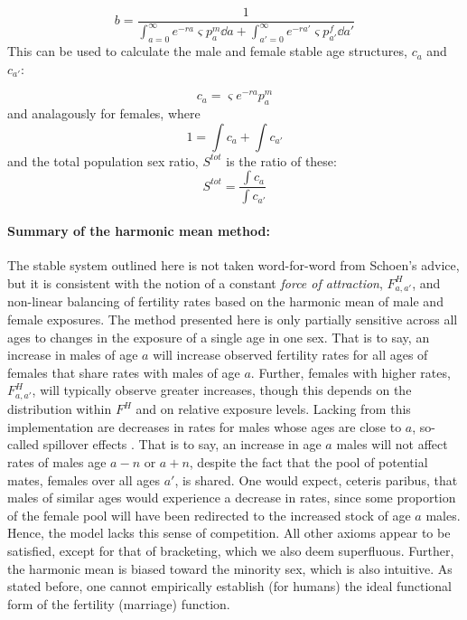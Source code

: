 \begin{equation}
b = \frac{1}{\int_{a = 0}^\infty e^{-ra} \varsigma p_a^m \dd a + \int_{a' =
0}^\infty e^{-ra'} \varsigma p_{a'}^f \dd a'}
\end{equation}
This can be used to calculate the male and female stable age structures, $c_a$
and $c_{a'}$:

\begin{equation}
c_a =  \varsigma  e^{-ra} p_a^m
\end{equation}
and analagously for females, where
\begin{equation}
1 = \int c_a + \int c_{a'}
\end{equation}
and the total population sex ratio, $S^{tot}$ is the ratio of these:
\begin{equation}
S^{tot} = \frac{\int c_a}{\int c_{a'}}
\end{equation}

\paragraph{Summary of the harmonic mean method: } The stable system outlined
here is not taken word-for-word from Schoen's advice, but it is consistent with the 
notion of a constant \textit{force of attraction},
$F_{a,a'}^H$, and non-linear balancing of fertility rates based on the harmonic
mean of male and female exposures. The method presented here is only partially
sensitive across all ages to changes in the exposure of a single age in one sex.
That is to say, an increase in males of age $a$ will increase observed fertility rates for all ages
of females that share rates with males of age $a$. Further, females with
higher rates, $F_{a,a'}^H$, will typically observe greater increases, though this
depends on the distribution within $F^H$ and on relative exposure levels.
Lacking from this implementation are decreases in rates for males whose ages are close
to $a$, so-called spillover effects \citep{choo2006estimating}. That is to say,
an increase in age $a$ males will not affect rates of males age $a-n$ or $a+n$, 
despite the fact that the pool of potential mates, females over
all ages $a'$, is shared. One would expect, ceteris paribus, that males of
similar ages would experience a decrease in rates, since some proportion of the
female pool will have been redirected to the increased stock of age $a$ males.
Hence, the model lacks this sense of competition. All other axioms appear to be
satisfied, except for that of bracketing, which we also deem superfluous.
Further, the harmonic mean is biased toward the minority sex, which is also intuitive.
 As stated before, one cannot empirically establish (for
humans) the ideal functional form of the fertility (marriage) function.

